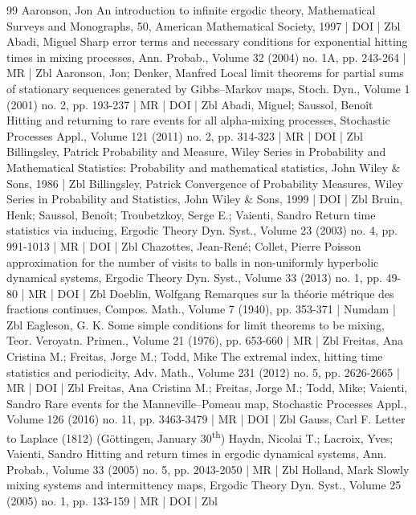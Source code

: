 \begin{thebibliography}{99}
Aaronson, Jon An introduction to infinite ergodic theory, Mathematical Surveys and Monographs, 50, American Mathematical Society, 1997 | DOI | Zbl
Abadi, Miguel Sharp error terms and necessary conditions for exponential hitting times in mixing processes, Ann. Probab., Volume 32 (2004) no. 1A, pp. 243-264 | MR | Zbl
Aaronson, Jon; Denker, Manfred Local limit theorems for partial sums of stationary sequences generated by Gibbs–Markov maps, Stoch. Dyn., Volume 1 (2001) no. 2, pp. 193-237 | MR | DOI | Zbl
Abadi, Miguel; Saussol, Benoît Hitting and returning to rare events for all alpha-mixing processes, Stochastic Processes Appl., Volume 121 (2011) no. 2, pp. 314-323 | MR | DOI | Zbl
Billingsley, Patrick Probability and Measure, Wiley Series in Probability and Mathematical Statistics: Probability and mathematical statistics, John Wiley \& Sons, 1986 | Zbl
Billingsley, Patrick Convergence of Probability Measures, Wiley Series in Probability and Statistics, John Wiley \& Sons, 1999 | DOI | Zbl
Bruin, Henk; Saussol, Benoît; Troubetzkoy, Serge E.; Vaienti, Sandro Return time statistics via inducing, Ergodic Theory Dyn. Syst., Volume 23 (2003) no. 4, pp. 991-1013 | MR | DOI | Zbl
Chazottes, Jean-René; Collet, Pierre Poisson approximation for the number of visits to balls in non-uniformly hyperbolic dynamical systems, Ergodic Theory Dyn. Syst., Volume 33 (2013) no. 1, pp. 49-80 | MR | DOI | Zbl
Doeblin, Wolfgang Remarques sur la théorie métrique des fractions continues, Compos. Math., Volume 7 (1940), pp. 353-371 | Numdam | Zbl
Eagleson, G. K. Some simple conditions for limit theorems to be mixing, Teor. Veroyatn. Primen., Volume 21 (1976), pp. 653-660 | MR | Zbl
Freitas, Ana Cristina M.; Freitas, Jorge M.; Todd, Mike The extremal index, hitting time statistics and periodicity, Adv. Math., Volume 231 (2012) no. 5, pp. 2626-2665 | MR | DOI | Zbl
Freitas, Ana Cristina M.; Freitas, Jorge M.; Todd, Mike; Vaienti, Sandro Rare events for the Manneville–Pomeau map, Stochastic Processes Appl., Volume 126 (2016) no. 11, pp. 3463-3479 | MR | DOI | Zbl
Gauss, Carl F. Letter to Laplace (1812) (Göttingen, January 30\textsuperscript{th})
Haydn, Nicolai T.; Lacroix, Yves; Vaienti, Sandro Hitting and return times in ergodic dynamical systems, Ann. Probab., Volume 33 (2005) no. 5, pp. 2043-2050 | MR | Zbl
Holland, Mark Slowly mixing systems and intermittency maps, Ergodic Theory Dyn. Syst., Volume 25 (2005) no. 1, pp. 133-159 | MR | DOI | Zbl

\end{thebibliography}
